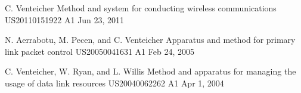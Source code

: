 

\begin{cventries}

  \cventry
    {C. Venteicher} %
    {Method and system for conducting wireless communications} %
    {US20110151922 A1} %
    {Jun 23, 2011} %
    {
    }

  \cventry
    {N. Aerrabotu, M. Pecen, and C. Venteicher} %
    {Apparatus and method for primary link packet control} %
    {US20050041631 A1} %
    {Feb 24, 2005} %
    {
    }


  \cventry
    {C. Venteicher, W. Ryan, and L. Willis} %
    {Method and apparatus for managing the usage of data link resources} %
    {US20040062262 A1} %
    {Apr 1, 2004} %
    {
    }


\end{cventries}
